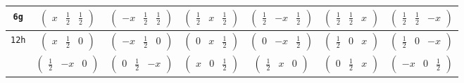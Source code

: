 \documentclass[fleqn,9pt,landscape]{jsarticle}
\begin{document}
\begin{center}
\begin{longtable}{ccccccc}
{\tt 6g} & $ \begin{pmatrix} x & \frac{1}{2} & \frac{1}{2} \end{pmatrix} $ & $ \begin{pmatrix} - x & \frac{1}{2} & \frac{1}{2} \end{pmatrix} $ & $ \begin{pmatrix} \frac{1}{2} & x & \frac{1}{2} \end{pmatrix} $ & $ \begin{pmatrix} \frac{1}{2} & - x & \frac{1}{2} \end{pmatrix} $ & $ \begin{pmatrix} \frac{1}{2} & \frac{1}{2} & x \end{pmatrix} $ & $ \begin{pmatrix} \frac{1}{2} & \frac{1}{2} & - x \end{pmatrix} $ \\ \hline
{\tt 12h} & $ \begin{pmatrix} x & \frac{1}{2} & 0 \end{pmatrix} $ & $ \begin{pmatrix} - x & \frac{1}{2} & 0 \end{pmatrix} $ & $ \begin{pmatrix} 0 & x & \frac{1}{2} \end{pmatrix} $ & $ \begin{pmatrix} 0 & - x & \frac{1}{2} \end{pmatrix} $ & $ \begin{pmatrix} \frac{1}{2} & 0 & x \end{pmatrix} $ & $ \begin{pmatrix} \frac{1}{2} & 0 & - x \end{pmatrix} $ \\
& $ \begin{pmatrix} \frac{1}{2} & - x & 0 \end{pmatrix} $ & $ \begin{pmatrix} 0 & \frac{1}{2} & - x \end{pmatrix} $ & $ \begin{pmatrix} x & 0 & \frac{1}{2} \end{pmatrix} $ & $ \begin{pmatrix} \frac{1}{2} & x & 0 \end{pmatrix} $ & $ \begin{pmatrix} 0 & \frac{1}{2} & x \end{pmatrix} $ & $ \begin{pmatrix} - x & 0 & \frac{1}{2} \end{pmatrix} $ \\ \hline

\end{longtable}
\end{center}
\end{document}
